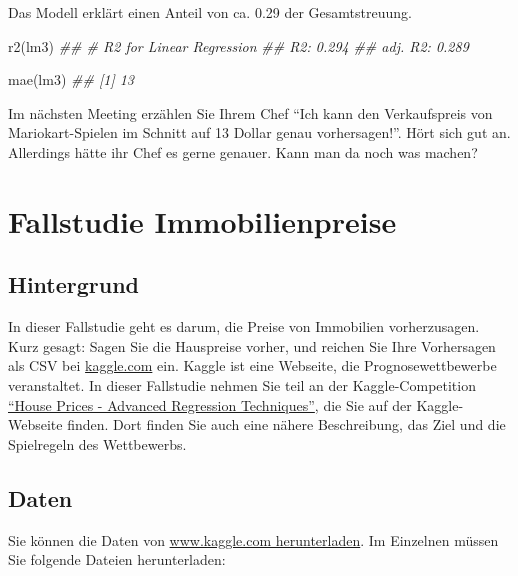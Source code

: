 \documentclass[
  letterpaper,
  twoside,
  open=any]{scrbook}
\newenvironment{Shaded}{\begin{snugshade}}{\end{snugshade}}
\newcommand{\DocumentationTok}[1]{\textcolor[rgb]{0.37,0.37,0.37}{\textit{#1}}}
\newcommand{\FunctionTok}[1]{\textcolor[rgb]{0.28,0.35,0.67}{#1}}
\newcommand{\NormalTok}[1]{\textcolor[rgb]{0.00,0.23,0.31}{#1}}
\theoremstyle{definition}
\theoremstyle{definition}
\theoremstyle{definition}
\theoremstyle{remark}
\begin{document}
Das Modell erklärt einen Anteil von ca. 0.29 der Gesamtstreuung.

\begin{Shaded}
\begin{Highlighting}[]
\FunctionTok{r2}\NormalTok{(lm3)}
\DocumentationTok{\#\# \# R2 for Linear Regression}
\DocumentationTok{\#\#        R2: 0.294}
\DocumentationTok{\#\#   adj. R2: 0.289}
\end{Highlighting}
\end{Shaded}

\begin{Shaded}
\begin{Highlighting}[]
\FunctionTok{mae}\NormalTok{(lm3)}
\DocumentationTok{\#\# [1] 13}
\end{Highlighting}
\end{Shaded}

Im nächsten Meeting erzählen Sie Ihrem Chef \enquote{Ich kann den
Verkaufspreis von Mariokart-Spielen im Schnitt auf 13 Dollar genau
vorhersagen!}. Hört sich gut an. Allerdings hätte ihr Chef es gerne
genauer. Kann man da noch was machen?

\section{Fallstudie Immobilienpreise}\label{fallstudie-immobilienpreise}

\subsection{Hintergrund}\label{hintergrund}

In dieser Fallstudie geht es darum, die Preise von Immobilien
vorherzusagen. Kurz gesagt: Sagen Sie die Hauspreise vorher, und reichen
Sie Ihre Vorhersagen als CSV bei
\href{https://www.kaggle.com/}{kaggle.com} ein. Kaggle ist eine
Webseite, die Prognosewettbewerbe veranstaltet. In dieser Fallstudie
nehmen Sie teil an der Kaggle-Competition
\href{https://www.kaggle.com/competitions/house-prices-advanced-regression-techniques/overview}{\enquote{House
Prices - Advanced Regression Techniques}}, die Sie auf der
Kaggle-Webseite finden. Dort finden Sie auch eine nähere Beschreibung,
das Ziel und die Spielregeln des Wettbewerbs.

\subsection{Daten}\label{daten-1}

Sie können die Daten von
\href{https://www.kaggle.com/competitions/house-prices-advanced-regression-techniques/data}{www.kaggle.com
herunterladen}. Im Einzelnen müssen Sie folgende Dateien herunterladen:
\end{document}

